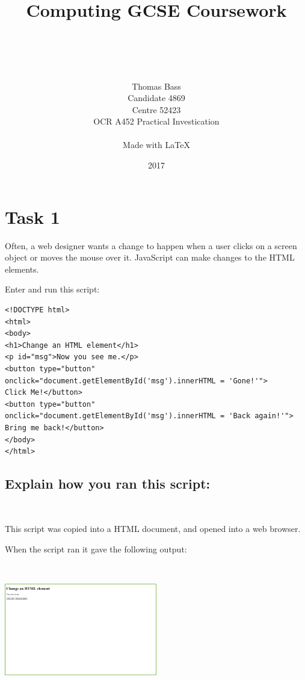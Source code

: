 \documentclass[a4paper]{article}
\title{Computing GCSE Coursework}
\author{\\ \\ \\ \\ Thomas Bass\\Candidate 4869\\Centre 52423\\OCR A452 Practical Investication\\\\Made with \LaTeX}
\date{2017}
\begin{document}
\maketitle
\pagebreak
\renewcommand*\contentsname{Summary}
\tableofcontents
\pagebreak


\section{Task 1}
Often, a web designer wants a change to happen when a user clicks on a screen object or moves the mouse over it. JavaScript can make changes to the HTML elements. \par
\noindent Enter and run this script: \par \par
\begin{lstlisting}
<!DOCTYPE html>
<html>
<body>
<h1>Change an HTML element</h1>
<p id="msg">Now you see me.</p>
<button type="button"
onclick="document.getElementById('msg').innerHTML = 'Gone!'">
Click Me!</button>
<button type="button"
onclick="document.getElementById('msg').innerHTML = 'Back again!'">
Bring me back!</button>
</body>
</html>
\end{lstlisting}
	

\subsection{Explain how you ran this script:} ~\par	

This script was copied into a HTML document, and opened into a web browser. 

When the script ran it gave the following output: ~\par ~\par
\noindent\includegraphics[width=0.5\textwidth, left, width=\linewidth, frame]{Picture1.png} \par 
\end{document}
